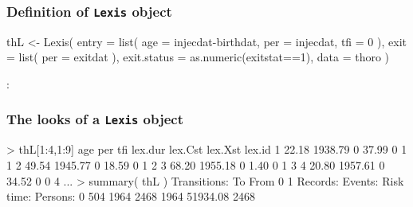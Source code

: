 \begin{frame}[fragile]
  \frametitle{Definition of \texttt{Lexis} object}
 \small
\renewcommand{\baselinestretch}{0.9}
\begin{semiverbatim}
thL <- Lexis( \alert<2>{entry = list( age = injecdat-birthdat,
                            \alert<5->{per = injecdat},
                            tfi = 0 )},
               \alert<3>{exit = list( \alert<5->{per = exitdat} )},
        exit.status = as.numeric(exitstat==1),
               data = thoro )
\end{semiverbatim}
\renewcommand{\baselinestretch}{1.0}
\normalsize
{} : 

\end{frame}

\begin{frame}[fragile]
  \frametitle{The looks of a \texttt{Lexis} object}
\small
\renewcommand{\baselinestretch}{0.9}
\begin{semiverbatim}
> thL[1:4,1:9]
    age     per tfi \alert<3>{lex.dur} \alert<5>{lex.Cst} \alert<4>{lex.Xst} lex.id
1 22.18 1938.79   0 \alert<3>{  37.99} \alert<5>{      0} \alert<4>{      1}      1
2 49.54 1945.77   0 \alert<3>{  18.59} \alert<5>{      0} \alert<4>{      1}      2
3 68.20 1955.18   0 \alert<3>{   1.40} \alert<5>{      0} \alert<4>{      1}      3
4 20.80 1957.61   0 \alert<3>{  34.52} \alert<5>{      0} \alert<4>{      0}      4
...
\pause
> summary( thL )
Transitions:
     \alert<4>{To}
\alert<5>{From} \alert<4>{  0    1} Records:  \alert<4>{Events:}  \alert<3>{Risk time:}  Persons:
\alert<5>{   0} \alert<4>{504 1964}     2468  \alert<4>{   1964}  \alert<3>{  51934.08}      2468
\end{semiverbatim}
\renewcommand{\baselinestretch}{1.0}
\end{frame}

